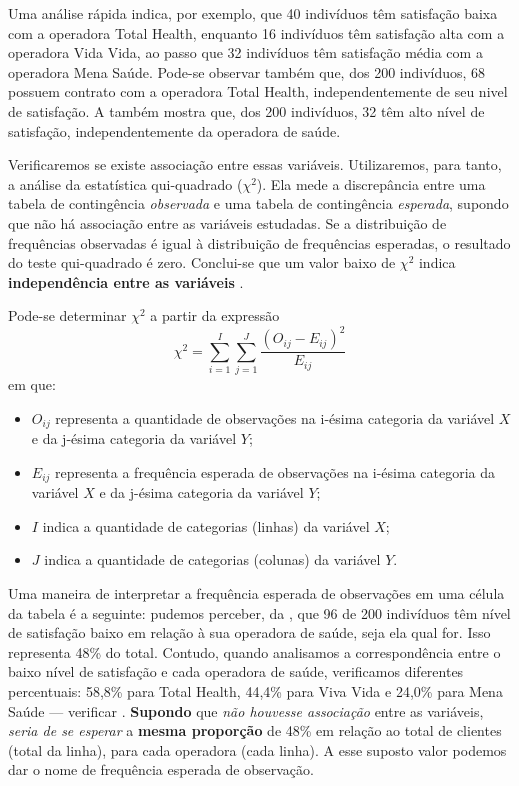 \begin{sol}
Uma análise rápida indica, por exemplo, que 40 indivíduos têm satisfação baixa
com a operadora Total Health, enquanto 16 indivíduos têm satisfação alta com a
operadora Vida Vida, ao passo que 32 indivíduos têm satisfação média com a
operadora Mena Saúde. Pode-se observar também que, dos 200 indivíduos, 68
possuem contrato com a operadora Total Health, independentemente de seu nivel
de satisfação. A  também mostra que, dos 200
indivíduos, 32 têm alto nível de satisfação, independentemente da operadora de
saúde.

Verificaremos se existe associação entre essas variáveis. Utilizaremos, para
tanto, a análise da estatística qui-quadrado ($\chi^2$). Ela mede a
discrepância entre uma tabela de contingência \emph{observada} e uma tabela de
contingência \emph{esperada}, supondo que não há associação entre as variáveis
estudadas. Se a distribuição de frequências observadas é igual à distribuição
de frequências esperadas, o resultado do teste qui-quadrado é zero. Conclui-se
que um valor baixo de $\chi^2$ indica \textbf{independência entre as variáveis}
\parencite[p.~237]{favero}.

Pode-se determinar $\chi^2$ a partir da expressão
\begin{equation}
    \chi^2 = \sum_{i=1}^{I} \sum_{j=1}^{J} \frac{(O_{ij} - E_{ij})^2}{E_{ij}}
    \label{eq:qui-quadrado}
\end{equation}
em que:
\begin{itemize}
    \item $O_{ij}$ representa a quantidade de observações na i-ésima categoria
    da variável $X$ e da j-ésima categoria da variável $Y$;
    \item $E_{ij}$ representa a frequência esperada de observações na i-ésima
    categoria da variável $X$ e da j-ésima categoria da variável $Y$;
    \item $I$ indica a quantidade de categorias (linhas) da variável $X$;
    \item $J$ indica a quantidade de categorias (colunas) da variável $Y$.
\end{itemize}

Uma maneira de interpretar a frequência esperada de observações em uma célula
da tabela é a seguinte: pudemos perceber, da ,
que 96 de 200 indivíduos têm nível de satisfação baixo em relação à sua
operadora de saúde, seja ela qual for. Isso representa 48\% do total. Contudo,
quando analisamos a correspondência entre o baixo nível de satisfação e cada
operadora de saúde, verificamos diferentes percentuais: 58,8\% para Total
Health, 44,4\% para Viva Vida e 24,0\% para Mena Saúde --- verificar
.
\textbf{Supondo} que \emph{não houvesse associação} entre as variáveis,
\emph{seria de se esperar} a \textbf{mesma proporção} de 48\% em relação ao
total de clientes (total da linha), para cada operadora (cada linha). A esse
suposto valor podemos dar o nome de frequência esperada de observação.


\end{sol}
